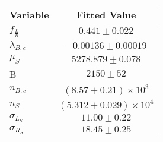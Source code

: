 \begin{tabular}[t]{lc}
\hline
Variable &Fitted Value\\
\hline\hline
$f_{\frac{L}{R}}$&$0.441\pm0.022$\\
\hline
$\lambda_{B,c}$&$-0.00136\pm0.00019$\\
\hline
$\mu_S$&$5278.879\pm0.078$\\
\hline
B&$2150\pm52$\\
\hline
$n_{B,c}$&$(8.57\pm0.21)\times 10^3$\\
\hline
$n_S$&$(5.312\pm0.029)\times 10^4$\\
\hline
$\sigma_{L_S}$&$11.00\pm0.22$\\
\hline
$\sigma_{R_S}$&$18.45\pm0.25$\\
\hline
\end{tabular}